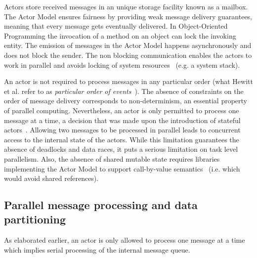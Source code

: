 \documentclass[11pt, journal]{IEEEtran}
\begin{document}
Actors store received messages in an unique storage facility known as a mailbox. The Actor Model ensures fairness by providing weak message delivery guarantees, meaning that every message gets eventually delivered. In Object-Oriented Programming the invocation of a method on an object can lock the invoking entity. The emission of messages in the Actor Model happens asynchronously and does not block the sender. The non blocking communication enables the actors to work in parallel and avoids locking of system resources~\cite{Karmani:2009:AFJ:1596655.1596658} (e.g. a system stack).

An actor is not required to process messages in any particular order (what Hewitt et al. refer to as \textit{particular order of events}~\cite{Hewi77a}). The absence of constraints on the order of message delivery corresponds to non-determinism, an essential property of parallel computing.
Nevertheless, an actor is only permitted to process one message at a time, a decision that was made upon the introduction of stateful actors~\cite{Yonezawa:1990:AOC:77683}. Allowing two messages to be processed in parallel leads to concurrent access to the internal state of the actors.
While this limitation guarantees the absence of deadlocks and data races, it puts a serious limitation on task level parallelism. 
Also, the absence of shared mutable state requires libraries implementing the Actor Model to support call-by-value semantics~\cite{Karmani:2009:AFJ:1596655.1596658} (i.e. which would avoid shared references).

\subsection{Parallel message processing and data partitioning}\label{subsec:messageprocessinganddatapartitioning}
As elaborated earlier, an actor is only allowed to process one message at a time which implies serial processing of the internal message queue. 
\end{document}
